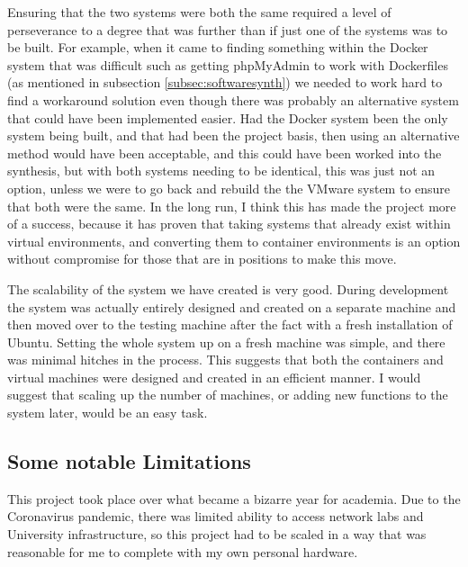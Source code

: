 Ensuring that the two systems were both the same required a level of perseverance to a degree that was further than if just one of the systems was to be built. For example, when it came to finding something within the Docker system that was difficult such as getting phpMyAdmin to work with Dockerfiles (as mentioned in subsection \ref{subsec:softwaresynth}) we needed to work hard to find a workaround solution even though there was probably an alternative system that could have been implemented easier. Had the Docker system been the only system being built, and that had been the project basis, then using an alternative method would have been acceptable, and this could have been worked into the synthesis, but with both systems needing to be identical, this was just not an option, unless we were to go back and rebuild the the VMware system to ensure that both were the same. In the long run, I think this has made the project more of a success, because it has proven that taking systems that already exist within virtual environments, and converting them to container environments is an option without compromise for those that are in positions to make this move.

The scalability of the system we have created is very good. During development the system was actually entirely designed and created on a separate machine and then moved over to the testing machine after the fact with a fresh installation of Ubuntu. Setting the whole system up on a fresh machine was simple, and there was minimal hitches in the process. This suggests that both the containers and virtual machines were designed and created in an efficient manner. I would suggest that scaling up the number of machines, or adding new functions to the system later, would be an easy task.

\subsection{Some notable Limitations}%
\label{HardwareLimitations}
This project took place over what became a bizarre year for academia. Due to the Coronavirus pandemic, there was limited ability to access network labs and University infrastructure, so this project had to be scaled in a way that was reasonable for me to complete with my own personal hardware.

